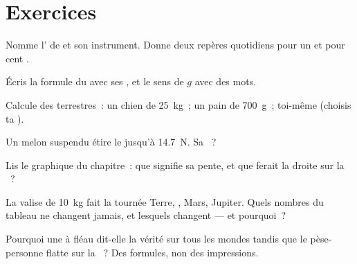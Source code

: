\section{Exercices}

\begin{exercise}[$\star$]\label{exo:g9:weight-vs-mass:1}
Nomme l' de  et son instrument. Donne deux repères
quotidiens pour un  et pour cent .
\end{exercise}

\begin{exercise}[$\star$]\label{exo:g9:weight-vs-mass:2}
Écris la formule du  avec ses , et le sens de $g$ avec des
mots.
\end{exercise}

\begin{exercise}[$\star$]\label{exo:g9:weight-vs-mass:3}
Calcule des  terrestres~: un chien de \qty{25}{kg}~; un pain de
\qty{700}{g}~; toi-même (choisis ta ).
\end{exercise}

\begin{exercise}[$\star$]\label{exo:g9:weight-vs-mass:4}
Un melon suspendu étire le  jusqu'à \qty{14.7}{N}. Sa
~?
\end{exercise}

\begin{exercise}[$\star$]\label{exo:g9:weight-vs-mass:5}
Lis le graphique du chapitre~: que signifie sa pente, et que ferait
la droite sur la ~?
\end{exercise}

\begin{exercise}[$\star$]\label{exo:g9:weight-vs-mass:6}
La valise de \qty{10}{kg} fait la tournée Terre, , Mars, Jupiter.
Quels nombres du tableau ne changent jamais, et lesquels changent ---
et pourquoi~?
\end{exercise}

\begin{exercise}[$\star$]\label{exo:g9:weight-vs-mass:7}
Pourquoi une  à fléau dit-elle la vérité sur tous les mondes
tandis que le pèse-personne flatte sur la ~? Des formules, non des
impressions.
\end{exercise}

